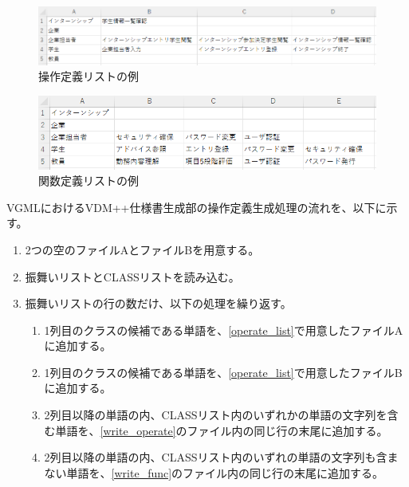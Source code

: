 \begin{figure}[t]
    \begin{center}
        \includegraphics[width=1.0\columnwidth]{image/operate_list.png}
        \caption{操作定義リストの例}
        \label{fig:operate_list}
    \end{center}
\end{figure}

\begin{figure}[t]
    \begin{center}
        \includegraphics[width=1.0\columnwidth]{image/func_list.png}
        \caption{関数定義リストの例}
        \label{fig:func_list}
    \end{center}
\end{figure}

VGMLにおけるVDM++仕様書生成部の操作定義生成処理の流れを、以下に示す。

\begin{enumerate}
    \item 2つの空のファイルAとファイルBを用意する。
    \label{operate_list}
    \item 振舞いリストとCLASSリストを読み込む。
    \item 振舞いリストの行の数だけ、以下の処理を繰り返す。
        \begin{enumerate}
            \item 1列目のクラスの候補である単語を、\ref{operate_list}で用意したファイルAに追加する。
            \label{write_operate}
            \item 1列目のクラスの候補である単語を、\ref{operate_list}で用意したファイルBに追加する。
            \label{write_func}
            \item 2列目以降の単語の内、CLASSリスト内のいずれかの単語の文字列を含む単語を、\ref{write_operate}のファイル内の同じ行の末尾に追加する。
            \item 2列目以降の単語の内、CLASSリスト内のいずれの単語の文字列も含まない単語を、\ref{write_func}のファイル内の同じ行の末尾に追加する。
        \end{enumerate}
\end{enumerate}

